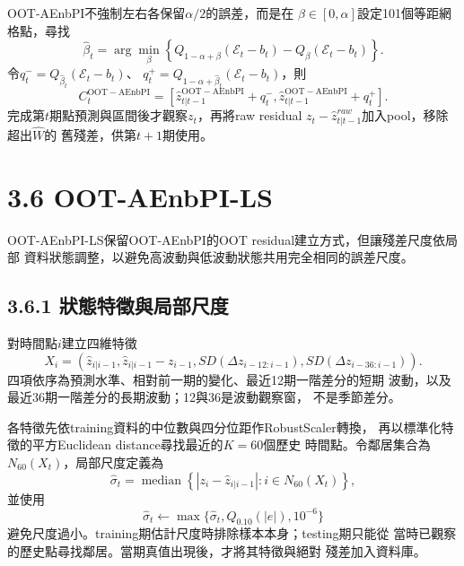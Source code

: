 OOT-AEnbPI不強制左右各保留$\alpha/2$的誤差，而是在
$\beta\in[0,\alpha]$設定101個等距網格點，尋找
\begin{equation}
 \widehat\beta_t=\arg\min_{\beta}
 \left\{Q_{1-\alpha+\beta}(\mathcal E_t-b_t)
       -Q_{\beta}(\mathcal E_t-b_t)\right\}.
\end{equation}
令$q_t^-=Q_{\widehat\beta_t}(\mathcal E_t-b_t)$、
$q_t^+=Q_{1-\alpha+\widehat\beta_t}(\mathcal E_t-b_t)$，則
\begin{equation}
 C_t^{\mathrm{OOT-AEnbPI}}=\left[
 \widehat z_{t|t-1}^{\mathrm{OOT-AEnbPI}}+q_t^-,
 \widehat z_{t|t-1}^{\mathrm{OOT-AEnbPI}}+q_t^+
 \right].
\end{equation}
完成第$t$期點預測與區間後才觀察$z_t$，再將raw residual
$z_t-\widehat z_{t|t-1}^{raw}$加入pool，移除超出$\widehat W$的
舊殘差，供第$t+1$期使用。

\section*{3.6 OOT-AEnbPI-LS}

OOT-AEnbPI-LS保留OOT-AEnbPI的OOT residual建立方式，但讓殘差尺度依局部
資料狀態調整，以避免高波動與低波動狀態共用完全相同的誤差尺度。

\subsection*{3.6.1 狀態特徵與局部尺度}

對時間點$i$建立四維特徵
\begin{equation}
 X_i=\left(
 \widehat z_{i|i-1},
 \widehat z_{i|i-1}-z_{i-1},
 SD(\Delta z_{i-12:i-1}),
 SD(\Delta z_{i-36:i-1})
 \right).
\end{equation}
四項依序為預測水準、相對前一期的變化、最近12期一階差分的短期
波動，以及最近36期一階差分的長期波動；12與36是波動觀察窗，
不是季節差分。

各特徵先依training資料的中位數與四分位距作RobustScaler轉換，
再以標準化特徵的平方Euclidean distance尋找最近的$K=60$個歷史
時間點。令鄰居集合為$N_{60}(X_t)$，局部尺度定義為
\begin{equation}
 \widehat\sigma_t=\operatorname{median}
 \left\{|z_i-\widehat z_{i|i-1}|:i\in N_{60}(X_t)\right\},
\end{equation}
並使用
\begin{equation}
 \widehat\sigma_t\leftarrow
 \max\{\widehat\sigma_t,Q_{0.10}(|e|),10^{-6}\}
\end{equation}
避免尺度過小。training期估計尺度時排除樣本本身；testing期只能從
當時已觀察的歷史點尋找鄰居。當期真值出現後，才將其特徵與絕對
殘差加入資料庫。

